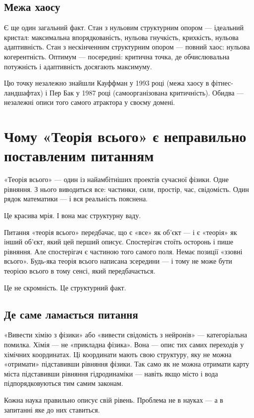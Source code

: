\documentclass[12pt, a4paper, openany]{book}
\begin{document}
\section{Межа хаосу}

Є ще один загальний факт. Стан з нульовим структурним опором --- ідеальний кристал: максимальна впорядкованість, нульова гнучкість, крихкість, нульова адаптивність. Стан з нескінченним структурним опором --- повний хаос: нульова когерентність. Оптимум --- посередині: критична точка, де обчислювальна потужність і адаптивність досягають максимуму.

Цю точку незалежно знайшли Кауффман у 1993 році (межа хаосу в фітнес-ландшафтах) і Пер Бак у 1987 році (самоорганізована критичність). Обидва --- незалежні описи того самого атрактора у своєму домені.

\chapter{Чому «Теорія всього» є неправильно поставленим питанням}

«Теорія всього» — один із найамбітніших проектів сучасної фізики. Одне рівняння. З нього виводиться все: частинки, сили, простір, час, свідомість. Один рядок математики — і вся реальність пояснена.

Це красива мрія. І вона має структурну ваду.

Питання «теорія всього» передбачає, що є «все» як об'єкт — і є «теорія» як інший об'єкт, який цей перший описує. Спостерігач стоїть осторонь і пише рівняння. Але спостерігач є частиною того самого поля. Немає позиції «ззовні всього». Будь-яка теорія всього написана зсередини — і тому не може бути теорією всього в тому сенсі, який передбачається.

Це не скромність. Це структурний факт.

\section{Де саме ламається питання}

«Вивести хімію з фізики» або «вивести свідомість з нейронів» — категоріальна помилка. Хімія — не «прикладна фізика». Вона — опис тих самих переходів у хімічних координатах. Ці координати мають свою структуру, яку не можна «отримати» підставивши рівняння фізики. Так само як не можна отримати карту міста підставивши рівняння гідродинаміки — навіть якщо місто і вода підпорядковуються тим самим законам.

Кожна наука правильно описує свій рівень. Проблема не в науках — а в запитанні яке до них ставиться.
\end{document}
